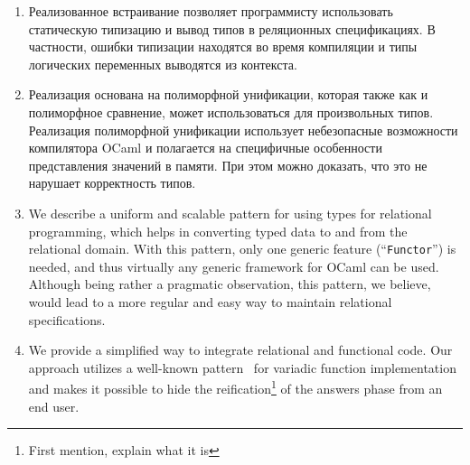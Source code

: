 \begin{enumerate}
\item Реализованное встраивание позволяет программисту использовать статическую типизацию и вывод типов в реляционных спецификациях. В частности, ошибки типизации находятся во время компиляции и типы логических переменных выводятся из контекста.

\item Реализация основана на полиморфной унификации, которая также как и полиморфное сравнение, может использоваться для произвольных типов.
Реализация полиморфной унификации использует небезопасные возможности компилятора OCaml и полагается на специфичные особенности представления значений в памяти.
При этом можно доказать, что это не нарушает корректность типов.

\item We describe a uniform and scalable pattern for using types for relational programming, which
helps in converting typed data to and from the relational domain. With this pattern, only one
generic feature (``\lstinline|Functor|'') is needed, and thus virtually any generic
framework for OCaml can be used. Although being rather a pragmatic observation, this pattern, we
believe, would lead to a more regular and easy way to maintain relational specifications.

\item We provide a simplified way to integrate relational and functional code. Our approach utilizes
a well-known pattern~\cite{Unparsing, DoWeNeed} for variadic function implementation and makes it
possible to hide the reification\footnote{First mention, explain what it is} of the answers phase from an end user.
\end{enumerate}

